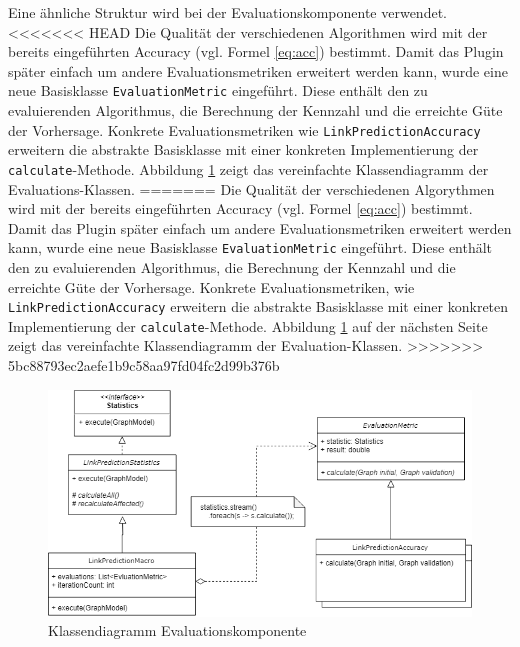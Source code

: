 Eine ähnliche Struktur wird bei der Evaluationskomponente verwendet.
<<<<<<< HEAD
Die Qualität der verschiedenen Algorithmen wird mit der bereits eingeführten Accuracy (vgl. Formel \ref{eq:acc}) bestimmt.
Damit das Plugin später einfach um andere Evaluationsmetriken erweitert werden kann, wurde eine neue Basisklasse \texttt{EvaluationMetric} eingeführt.
Diese enthält den zu evaluierenden Algorithmus, die Berechnung der Kennzahl und die erreichte Güte der Vorhersage. Konkrete Evaluationsmetriken wie \texttt{LinkPredictionAccuracy} erweitern die abstrakte Basisklasse mit einer konkreten Implementierung der \texttt{calculate}-Methode.
Abbildung \ref{fig:class_eval} zeigt das vereinfachte Klassendiagramm der Evaluations-Klassen.
=======
Die Qualität der verschiedenen Algorythmen wird mit der bereits eingeführten Accuracy (vgl. Formel \ref{eq:acc}) bestimmt.
Damit das Plugin später einfach um andere Evaluationsmetriken erweitert werden kann, wurde eine neue Basisklasse \texttt{EvaluationMetric} eingeführt.
Diese enthält den zu evaluierenden Algorithmus, die Berechnung der Kennzahl und die erreichte Güte der Vorhersage. Konkrete Evaluationsmetriken, wie \texttt{LinkPredictionAccuracy} erweitern die abstrakte Basisklasse mit einer konkreten Implementierung der \texttt{calculate}-Methode.
Abbildung \ref{fig:class_eval} auf der nächsten Seite zeigt das vereinfachte Klassendiagramm der Evaluation-Klassen.
>>>>>>> 5bc88793ec2aefe1b9c58aa97fd04fc2d99b376b
\begin{figure}
    \centering
    \includegraphics[width=\linewidth]{resources/class_Evaluation.png}
    \caption{Klassendiagramm Evaluationskomponente}
    \label{fig:class_eval}
\end{figure}

